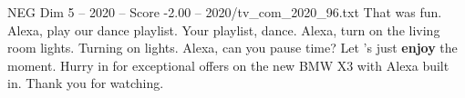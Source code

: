 \begin{textsample}{NEG Dim 5 – 2020 – Score -2.00 – 2020/tv\_com\_2020\_96.txt}  \label{ex:f5_neg_063}
That was fun.
Alexa, play our dance playlist.
Your playlist, dance.
Alexa, turn on the living room lights.
Turning on lights.
Alexa, can you pause time?
Let 's just \textbf{enjoy} the moment.
Hurry in for exceptional offers on the new BMW X3 with Alexa built in.
Thank you for watching.

\end{textsample}
